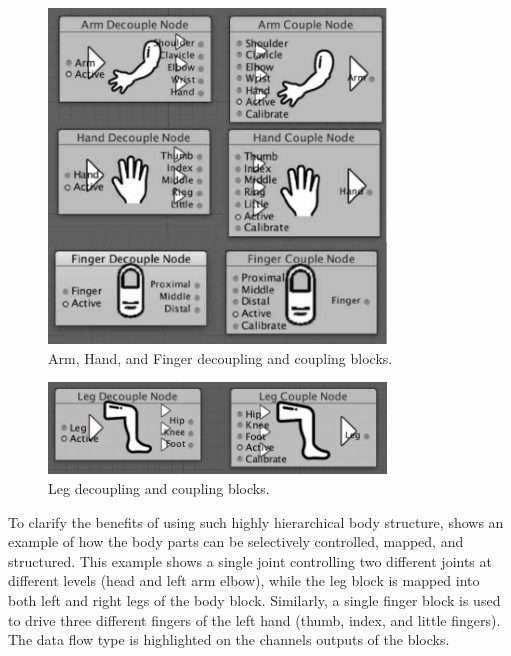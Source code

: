 \begin{figure}[htpb]
\centering
\captionsetup{justification=centering} 
\includegraphics[width=0.8\textwidth]{figures/system/Blocks/Arm.pdf}
\caption{Arm, Hand, and Finger decoupling and coupling blocks.}
  \label{fig:system-blocks-arm}
\end{figure}

\begin{figure}[htpb]
\centering
\captionsetup{justification=centering} 
\includegraphics[width=0.8\textwidth]{figures/system/Blocks/Leg.png}
\caption{Leg decoupling and coupling blocks.}
  \label{fig:system-blocks-leg}
\end{figure}

To clarify the benefits of using such highly hierarchical body structure,  shows an example of how the body parts can be selectively controlled, mapped, and structured. This example shows a single joint controlling two different joints at different levels (head and left arm elbow), while the leg block is mapped into both left and right legs of the body block. Similarly, a single finger block is used to drive three different fingers of the left hand (thumb, index, and little fingers). The data flow type is highlighted on the channels outputs of the blocks. 

